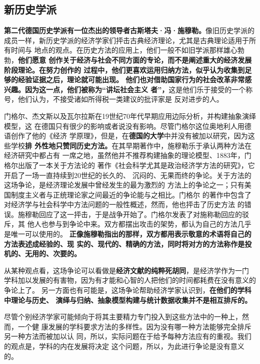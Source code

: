 \subsection{新历史学派}

\textbf{第二代德国历史学派有一位杰出的领导者古斯塔夫·冯·施穆勒。}像旧历史学派的
成员一样，新历史学派的经济学家们抨击古典经济理论，尤其是古典理论适用于所有时间与
地点的观点。在历史方法的应用上，他们一般不如旧学派那样雄心勃勃，\textbf{他们愿意
创作关于经济与社会不同方面的专论，而不是阐述重大的经济发展阶段理论。在努力创作的
过程中，他们更喜欢运用归纳方法，似乎认为收集到足够的经验证据之后，理论就可能出现。
他们也对借助国家行为的社会改革非常感兴趣。因为这一点，他们被称为“讲坛社会主义
者”，}这是他们乐于接受的一个称号，他们认为，不接受诸如所得税一类建议的批评家是
反对进步的人。

门格尔、杰文斯以及瓦尔拉斯在19世纪70年代早期应用边际分析，并构建抽象演绎模型，这
在德国只有很少的影响或者说没有影响。尽管门格尔这位奥地利人用德语创作了他的《经济
学原理》，但是，在\textbf{德国的大学}中并没有被加以研究，因为这些学校\textbf{排
外性地只赞同历史方法。}在其早期著作中，施穆勒乐于承认两种方法在经济研究中都占有
一席之地，虽然他并不推荐构建抽象的理论模型、1883年，门格尔出版了一本关于方法论的
著作《社会科学尤其是政治经济学方法的研究》，它开启了一场一直持续到20世纪的长久的、
沉闷的、无果而终的争论。关于方法的这场争论，是经济理论发展中曾经发生的最为激烈的
方法上的争论之一；只有美国制度主义者与正统理论家之间最近的争论能与之相比。门格尔
的著作中包含了对经济学与社会科学中方法问题的一般性概述，然而，他也抨击了历史方法
的错误。施穆勒回应了这一抨击，于是战争开始了。门格尔发表了对施称勒回应的驳斥，其
他人也参与到争论中来。双方都摆出攻击的架势，都认为自己的方法几乎是唯一可以使用的。
\textbf{正像施穆勒指出的那样，双方都用表示敬意的术语将自己的方法表述成经验的、现
实的、现代的、精确的方法，同时将对方的方法称作是投机的、无用的、次要的。}

从某种观点看，这场争论可以看做是\textbf{经济文献的纯粹死胡同}，是经济学作为一门
学科加以发展的有害物，因为有才能和心智的人把他们的时间都耗费在没有意义的争论上了。
另一方面也有可能是，这场争论帮助经济学家认识到，\textbf{在他们的学科中理论与历史、
演绎与归纳、抽象模型构建与统计数据收集并不是相互排斥的。}

尽管个别经济学家可能倾向于将其主要精力专门投入到这些方法中的一种上，然而，一个健
康发展的学科要求方法的多样性。因为没有哪一种方法能够完全排斥另一种方法而被加以认
同，所以，实际问题在于给予每种方法应有的重视。我们的观点是，学科的内在发展将决定
这个问题，所以，为此进行争论是没有意义的。

